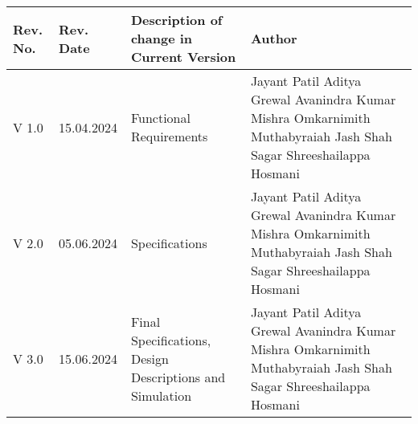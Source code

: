 \newpage
{}

\begin{table}[H]
	\centering
	\begin{tabular}{|p{2cm}|p{2.3cm}|p{5.5cm}|p{6cm}|}
		\hline
		\textbf{Rev. No.} & \textbf{Rev. Date} & \textbf{Description of change in Current Version} & \textbf{Author}\\
		\hline
		\hline
		V 1.0 & 15.04.2024 & Functional Requirements & Jayant Patil \newline Aditya Grewal \newline Avanindra Kumar Mishra \newline Omkarnimith Muthabyraiah \newline Jash Shah \newline Sagar Shreeshailappa Hosmani\\
		\hline
		V 2.0 & 05.06.2024 & Specifications & Jayant Patil \newline Aditya Grewal \newline Avanindra Kumar Mishra \newline Omkarnimith Muthabyraiah \newline Jash Shah \newline Sagar Shreeshailappa Hosmani\\
		\hline
		V 3.0 & 15.06.2024 & Final Specifications, Design Descriptions and Simulation & Jayant Patil \newline Aditya Grewal \newline Avanindra Kumar Mishra \newline Omkarnimith Muthabyraiah \newline Jash Shah \newline Sagar Shreeshailappa Hosmani\\
		\hline
	\end{tabular}
\end{table}
